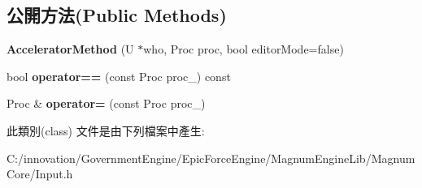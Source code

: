 \subsection*{公開方法(Public Methods)}
\begin{DoxyCompactItemize}
\item 
{\bfseries Accelerator\+Method} (U $\ast$who, Proc proc, bool editor\+Mode=false)\hypertarget{class_i_dream_sky_1_1_input_1_1_accelerator_method_ae9329d02a815c2bb2de839f270fd5fb1}{}\label{class_i_dream_sky_1_1_input_1_1_accelerator_method_ae9329d02a815c2bb2de839f270fd5fb1}

\item 
bool {\bfseries operator==} (const Proc proc\+\_\+) const \hypertarget{class_i_dream_sky_1_1_input_1_1_accelerator_method_a3640e028925a4ea1ddd2ed0bf1ad8792}{}\label{class_i_dream_sky_1_1_input_1_1_accelerator_method_a3640e028925a4ea1ddd2ed0bf1ad8792}

\item 
Proc \& {\bfseries operator=} (const Proc proc\+\_\+)\hypertarget{class_i_dream_sky_1_1_input_1_1_accelerator_method_ae33383ed019110cebbf6b440b9adf4fa}{}\label{class_i_dream_sky_1_1_input_1_1_accelerator_method_ae33383ed019110cebbf6b440b9adf4fa}

\end{DoxyCompactItemize}


此類別(class) 文件是由下列檔案中產生\+:\begin{DoxyCompactItemize}
\item 
C\+:/innovation/\+Government\+Engine/\+Epic\+Force\+Engine/\+Magnum\+Engine\+Lib/\+Magnum\+Core/Input.\+h\end{DoxyCompactItemize}
